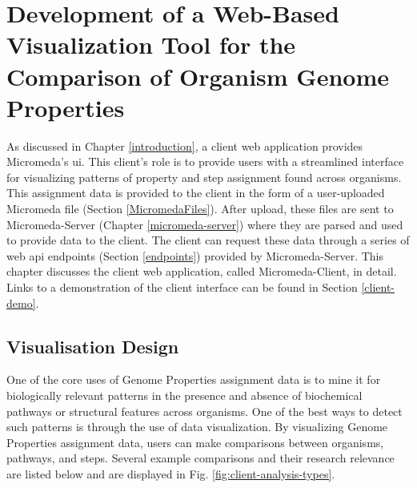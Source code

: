 \chapter{Development of a Web-Based Visualization Tool for the Comparison of Organism Genome Properties} \label{micromeda-client}

As discussed in Chapter \ref{introduction}, a client web application provides Micromeda's \gls{ui}. This client's role is to provide users with a streamlined interface for visualizing patterns of property and step assignment found across organisms. This assignment data is provided to the client in the form of a user-uploaded Micromeda file (Section \ref{MicromedaFiles}). After upload, these files are sent to Micromeda-Server (Chapter \ref{micromeda-server}) where they are parsed and used to provide data to the client. The client can request these data through a series of web \gls{api} endpoints (Section \ref{endpoints}) provided by Micromeda-Server. This chapter discusses the client web application, called Micromeda-Client, in detail. Links to a demonstration of the client interface can be found in Section \ref{client-demo}.

\section{Visualisation Design} \label{visualization-design}

One of the core uses of Genome Properties assignment data is to mine it for biologically relevant patterns in the presence and absence of biochemical pathways or structural features across organisms. One of the best ways to detect such patterns is through the use of data visualization. By visualizing Genome Properties assignment data, users can make comparisons between organisms, pathways, and steps. Several example comparisons and their research relevance are listed below and are displayed in Fig. \ref{fig:client-analysis-types}. 

